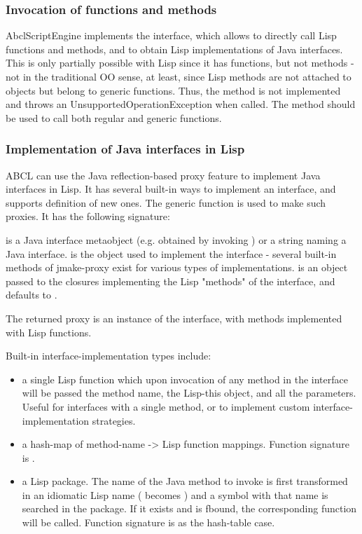 \documentclass[10pt]{book}
\begin{document}
\subsubsection{Invocation of functions and methods}

AbclScriptEngine implements the 
interface, which allows to directly call Lisp functions and methods,
and to obtain Lisp implementations of Java interfaces. This is only
partially possible with Lisp since it has functions, but not methods -
not in the traditional OO sense, at least, since Lisp methods are not
attached to objects but belong to generic functions. Thus, the method
 is not implemented and throws an
UnsupportedOperationException when called. The 
method should be used to call both regular and generic functions.

\subsubsection{Implementation of Java interfaces in Lisp}

ABCL can use the Java reflection-based proxy feature to implement Java
interfaces in Lisp. It has several built-in ways to implement an
interface, and supports definition of new ones. The
 generic function is used to make such
proxies. It has the following signature:


 is a Java interface metaobject (e.g. obtained by
invoking ) or a string naming a Java
interface.  is the object used to implement the
interface - several built-in methods of jmake-proxy exist for various
types of implementations.  is an object passed to the
closures implementing the Lisp "methods" of the interface, and
defaults to .

The returned proxy is an instance of the interface, with methods
implemented with Lisp functions.

Built-in interface-implementation types include:

\begin{itemize}
\item a single Lisp function which upon invocation of any method in
  the interface will be passed the method name, the Lisp-this object,
  and all the parameters. Useful for interfaces with a single method,
  or to implement custom interface-implementation strategies.
\item a hash-map of method-name -> Lisp function mappings. Function
  signature is .
\item a Lisp package. The name of the Java method to invoke is first
  transformed in an idiomatic Lisp name ( becomes
  ) and a symbol with that name is searched in
  the package. If it exists and is fbound, the corresponding function
  will be called. Function signature is as the hash-table case.
\end{itemize}
\end{document}
